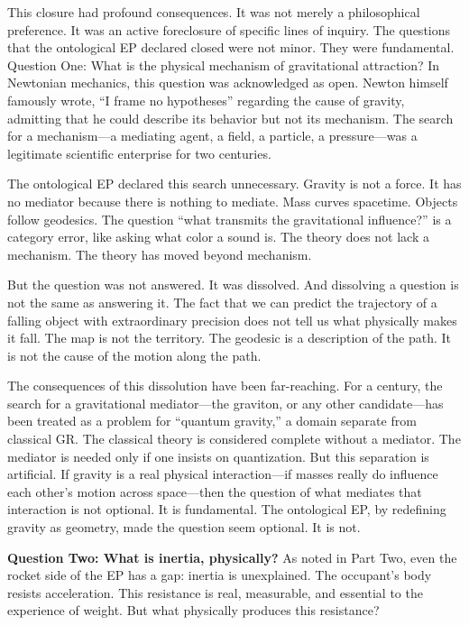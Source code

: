 \documentclass[11pt]{article}
\begin{document}
This closure had profound consequences. It was not merely a philosophical preference. It was an active foreclosure of specific lines of inquiry. The questions that the ontological EP declared closed were not minor. They were fundamental. Question One: What is the physical mechanism of gravitational attraction? In Newtonian mechanics, this question was acknowledged as open. Newton himself famously wrote, ``I frame no hypotheses'' regarding the cause of gravity, admitting that he could describe its behavior but not its mechanism. The search for a mechanism---a mediating agent, a field, a particle, a pressure---was a legitimate scientific enterprise for two centuries.

The ontological EP declared this search unnecessary. Gravity is not a force. It has no mediator because there is nothing to mediate. Mass curves spacetime. Objects follow geodesics. The question ``what transmits the gravitational influence?'' is a category error, like asking what color a sound is. The theory does not lack a mechanism. The theory has moved beyond mechanism.

But the question was not answered. It was dissolved. And dissolving a question is not the same as answering it. The fact that we can predict the trajectory of a falling object with extraordinary precision does not tell us what physically makes it fall. The map is not the territory. The geodesic is a description of the path. It is not the cause of the motion along the path.

The consequences of this dissolution have been far-reaching. For a century, the search for a gravitational mediator---the graviton, or any other candidate---has been treated as a problem for ``quantum gravity,'' a domain separate from classical GR. The classical theory is considered complete without a mediator. The mediator is needed only if one insists on quantization. But this separation is artificial. If gravity is a real physical interaction---if masses really do influence each other's motion across space---then the question of what mediates that interaction is not optional. It is fundamental. The ontological EP, by redefining gravity as geometry, made the question seem optional. It is not.

\textbf{Question Two: What is inertia, physically?} As noted in Part Two, even the rocket side of the EP has a gap: inertia is unexplained. The occupant's body resists acceleration. This resistance is real, measurable, and essential to the experience of weight. But what physically produces this resistance?
\end{document}
